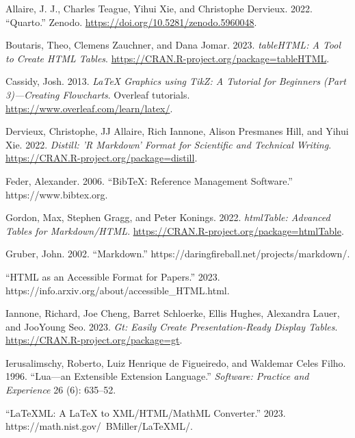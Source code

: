 \hypertarget{refs}{}
\begin{CSLReferences}{1}{0}
\leavevmode{}%
Allaire, J. J., Charles Teague, Yihui Xie, and Christophe Dervieux. 2022. {``Quarto.''} Zenodo. \url{https://doi.org/10.5281/zenodo.5960048}.

\leavevmode{}%
Boutaris, Theo, Clemens Zauchner, and Dana Jomar. 2023. \emph{tableHTML: A Tool to Create HTML Tables}. \url{https://CRAN.R-project.org/package=tableHTML}.

\leavevmode{}%
Cassidy, Josh. 2013. \emph{{LaTeX Graphics using TikZ: A Tutorial for Beginners (Part 3)---Creating Flowcharts}}. Overleaf tutorials. \url{https://www.overleaf.com/learn/latex/}.

\leavevmode{}%
Dervieux, Christophe, JJ Allaire, Rich Iannone, Alison Presmanes Hill, and Yihui Xie. 2022. \emph{Distill: 'R Markdown' Format for Scientific and Technical Writing}. \url{https://CRAN.R-project.org/package=distill}.

\leavevmode{}%
Feder, Alexander. 2006. {``BibTeX: Reference Management Software.''} https://www.bibtex.org.

\leavevmode{}%
Gordon, Max, Stephen Gragg, and Peter Konings. 2022. \emph{htmlTable: Advanced Tables for Markdown/HTML}. \url{https://CRAN.R-project.org/package=htmlTable}.

\leavevmode{}%
Gruber, John. 2002. {``Markdown.''} https://daringfireball.net/projects/markdown/.

\leavevmode{}%
{``HTML as an Accessible Format for Papers.''} 2023. https://info.arxiv.org/about/accessible\_HTML.html.

\leavevmode{}%
Iannone, Richard, Joe Cheng, Barret Schloerke, Ellis Hughes, Alexandra Lauer, and JooYoung Seo. 2023. \emph{Gt: Easily Create Presentation-Ready Display Tables}. \url{https://CRAN.R-project.org/package=gt}.

\leavevmode{}%
Ierusalimschy, Roberto, Luiz Henrique de Figueiredo, and Waldemar Celes Filho. 1996. {``Lua---an Extensible Extension Language.''} \emph{Software: Practice and Experience} 26 (6): 635--52.

\leavevmode{}%
{``{LaTeXML}: A {LaTeX} to {XML/HTML/MathML} Converter.''} 2023. https://math.nist.gov/~BMiller/LaTeXML/.


\end{CSLReferences}
